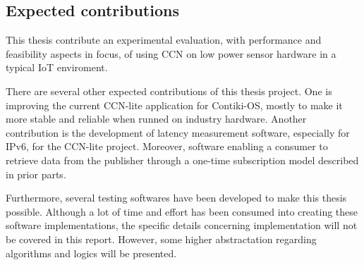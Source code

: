 \subsection{Expected contributions}
This thesis contribute an experimental evaluation, with performance and feasibility aspects in focus, of using CCN on low power sensor hardware in a typical IoT enviroment.

There are several other expected contributions of this thesis project. One is improving the current CCN-lite application for Contiki-OS, mostly to make it more stable and reliable when runned on industry hardware. Another contribution is the development of latency measurement software, especially for IPv6, for the CCN-lite project. Moreover, software enabling a consumer to retrieve data from the publisher through a one-time subscription model described in prior parts.


Furthermore, several testing softwares have been developed to make this thesis possible. Although a lot of time and effort has been consumed into creating these software implementations, the specific details concerning implementation will not be covered in this report. However, some higher abstractation regarding algorithms and logics will be presented.




